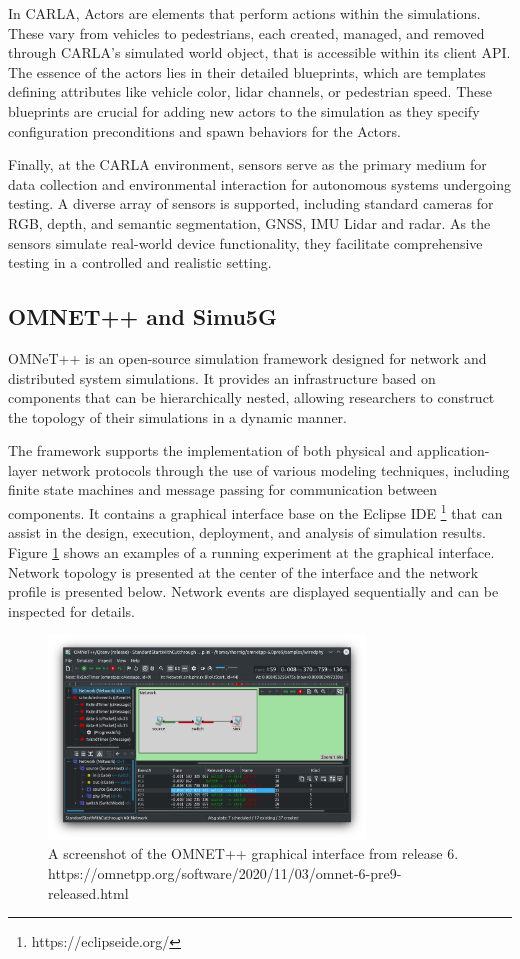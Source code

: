 In CARLA, Actors are elements that perform actions within the simulations. These vary from vehicles to pedestrians, each created, managed, and removed through CARLA’s simulated world object, that is accessible within its client API. The essence of the actors lies in their detailed blueprints, which are templates defining attributes like vehicle color, lidar channels, or pedestrian speed. These blueprints are crucial for adding new actors to the simulation as they specify configuration preconditions and spawn behaviors for the Actors.

Finally, at the CARLA environment, sensors serve as the primary medium for data collection and environmental interaction for autonomous systems undergoing testing. A diverse array of sensors is supported, including standard cameras for RGB, depth, and semantic segmentation, GNSS, IMU Lidar and radar. As the sensors simulate real-world device functionality, they facilitate comprehensive testing in a controlled and realistic setting.

\subsection{OMNET++ and Simu5G}

OMNeT++ is an open-source simulation framework designed for network and distributed system simulations. It provides an infrastructure based on components that can be hierarchically nested, allowing researchers to construct the topology of their simulations in a dynamic manner.

The framework supports the implementation of both physical and application-layer network protocols through the use of various modeling techniques, including finite state machines and message passing for communication between components. It contains a graphical interface base on the Eclipse IDE \footnote{https://eclipseide.org/} that can assist in the design, execution, deployment, and analysis of simulation results. Figure \ref{fig:OMNET_IDE} shows an examples of a running experiment at the graphical interface. Network topology is presented at the center of the interface and the network profile is presented below. Network events are displayed sequentially and can be inspected for details.

\begin{figure} [!ht]
    \centering
    \includegraphics[width=0.75\textwidth]{parts/figuras/OMNET_IDE.pdf}
    \caption{A screenshot of the OMNET++ graphical interface from release 6. https://omnetpp.org/software/2020/11/03/omnet-6-pre9-released.html}
    \label{fig:OMNET_IDE}
\end{figure}


